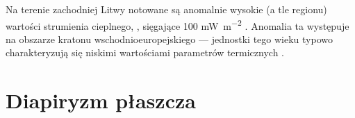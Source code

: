 \documentclass[11.5pt,twoside]{report}
\newcommand{\ct}[1]{\ignorespaces} %
\begin{document}
  	
  	
  	
Na terenie zachodniej Litwy notowane są anomalnie wysokie (a tle regionu) wartości strumienia cieplnego, \parencite{Sliaupa.2012}, sięgające 100 \si{\milli\watt\per\meter\squared} \parencite{Puura.2003}. Anomalia ta występuje na obszarze kratonu wschodnioeuropejskiego --- jednostki tego wieku typowo charakteryzują się niskimi wartościami parametrów termicznych \ct{zrodlo}.

	\section{Diapiryzm płaszcza}

\end{document}
